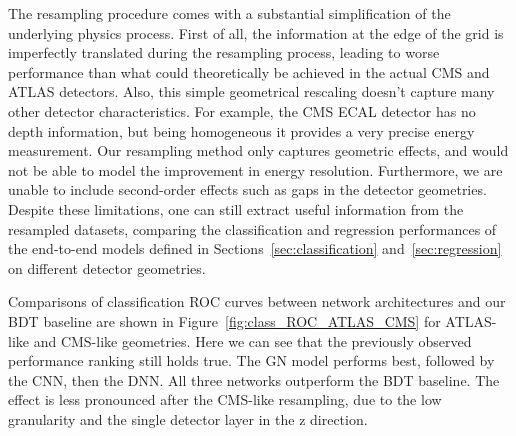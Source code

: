 The resampling procedure comes with a substantial simplification of the underlying physics process. First of all, the information at the edge of the grid is imperfectly translated during the resampling process, leading to worse performance than what could theoretically be achieved in the actual CMS and ATLAS detectors. Also, this simple geometrical rescaling doesn't capture many other detector characteristics. For example, the CMS ECAL detector has no depth information, but being homogeneous it provides a very precise energy measurement. Our resampling method only captures geometric effects, and would not be able to model the improvement in energy resolution. Furthermore, we are unable to include second-order effects such as gaps in the detector geometries. Despite these limitations, one can still extract useful information from the resampled datasets, comparing the classification and regression performances of the end-to-end models defined in Sections~\ref{sec:classification} and~\ref{sec:regression} on different detector geometries.

Comparisons of classification ROC curves between network architectures and our BDT baseline are shown in Figure~\ref{fig:class_ROC_ATLAS_CMS} for ATLAS-like and CMS-like geometries. Here we can see that the previously observed performance ranking still holds true. The GN
model performs best, followed by the CNN, then the DNN. All three networks outperform the BDT baseline. The effect is less pronounced after the CMS-like resampling, due to the low granularity and the single detector layer in the z direction.


